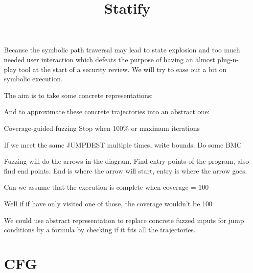 \documentclass[letterpaper,12pt]{article}
\title{Statify}
\begin{document}
\maketitle

Because the symbolic path traversal may lead to state explosion and too much needed user interaction which defeats the purpose of having an almost plug-n-play tool at the start of a security review. We will try to ease out a bit on symbolic execution.

The aim is to take some concrete representations:


And to approximate these concrete trajectories into an abstract one:



Coverage-guided fuzzing
Stop when 100\% or maximum iterations 

If we meet the same JUMPDEST multiple times, write bounds. Do some BMC

Fuzzing will do the arrows in the diagram.
Find entry points of the program, also find end points.
End is where the arrow will start, entry is where the arrow goes.


Can we assume that the execution is complete when coverage = 100%


Well if if have only visited one of those, the coverage wouldn't be 100%

We could use abstract representation to replace concrete fuzzed inputs for jump conditions by a formula by checking if it fits all the trajectories.

\section{CFG}
\end{document}
